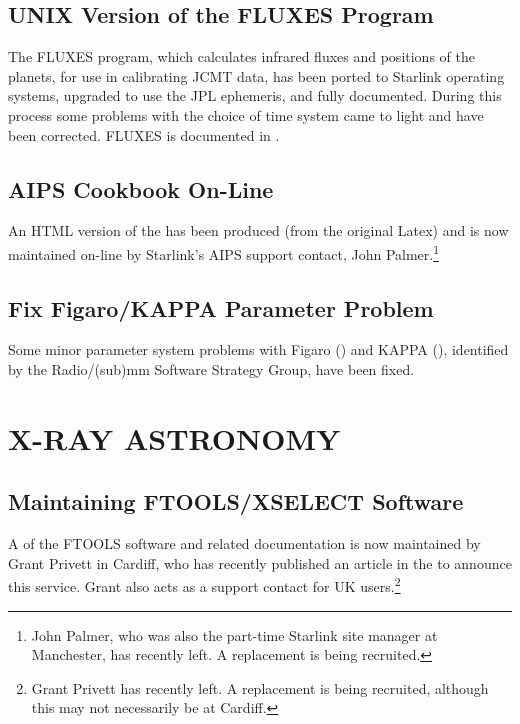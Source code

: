 \subsection{UNIX Version of the FLUXES Program}

The FLUXES program, which calculates infrared fluxes and positions of
the planets, for use in calibrating JCMT data, has been ported to
Starlink operating systems, upgraded to use the JPL ephemeris, and
fully documented. During this process some problems with the choice of
time system came to light and have been corrected. FLUXES is
documented in .

\subsection{AIPS Cookbook On-Line}

An HTML version of the 
has been produced (from the original Latex) and is now maintained
on-line by Starlink's AIPS support contact, John Palmer.\footnote{John
Palmer, who was also the part-time Starlink site manager at
Manchester, has recently left. A replacement is being recruited.}

\subsection{Fix Figaro/KAPPA Parameter Problem}

Some minor parameter system problems with Figaro
() and KAPPA (),
identified by the Radio/(sub)mm Software Strategy Group, have been
fixed.

\section{X-RAY ASTRONOMY}

\subsection{Maintaining FTOOLS/XSELECT Software}

A  of the
FTOOLS software and related documentation is now maintained by Grant
Privett in Cardiff, who has recently published an article in the
 to
announce this service. Grant also acts as a support contact for UK
users.\footnote{Grant Privett has recently left. A replacement is
being recruited, although this may not necessarily be at Cardiff.}

